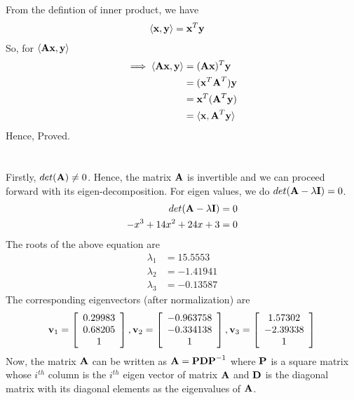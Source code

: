 \documentclass[12pt, a4paper]{article}
\begin{document}
\section{}

From the defintion of inner product, we have
\begin{align*}
    \langle \textbf{x}, \textbf{y} \rangle &= \textbf{x}^{T} \textbf{y}
\end{align*}
So, for $\langle \textbf{A}\textbf{x}, \textbf{y} \rangle$
\begin{align*}
    \implies \langle \textbf{A}\textbf{x}, \textbf{y} \rangle &= (\textbf{A}\textbf{x})^{T} \textbf{y} \\
    &= ( \textbf{x}^{T} \textbf{A}^{T}) \textbf{y} \\
    &=  \textbf{x}^{T} (\textbf{A}^{T} \textbf{y}) \\
    &=  \langle \textbf{x}, \textbf{A}^{T} \textbf{y} \rangle \\
\end{align*}
Hence, Proved.

\newpage
\section{}
Firstly, $det (\textbf{A}) \neq 0$. Hence, the matrix $\textbf{A}$ is invertible and we can proceed forward with its eigen-decomposition. For eigen values, we do $det(\textbf{A} - \lambda \textbf{I}) = 0$.
\begin{align*}
    det(\textbf{A} - \lambda \textbf{I}) &= 0 \\
    -x^3+14 x^2+24 x+3 &= 0
\end{align*}
The roots of the above equation are
\begin{align*}
    \lambda_1 &= 15.5553 \\
    \lambda_2 &= -1.41941 \\
    \lambda_3 &= -0.13587
\end{align*}
The corresponding eigenvectors (after normalization) are
\begin{align*}
    \textbf{v}_1 = \left[ {\begin{array}{c}
        0.29983 \\
        0.68205 \\
        1
    \end{array} } \right],
    \textbf{v}_2 = \left[ {\begin{array}{c}
        -0.963758 \\
        -0.334138 \\
        1
    \end{array} } \right],
    \textbf{v}_3 = \left[ {\begin{array}{c}
        1.57302 \\
        -2.39338 \\
        1
    \end{array} } \right]
\end{align*}
Now, the matrix $\textbf{A}$ can be written as $\textbf{A} = \textbf{P} \textbf{D} \textbf{P}^{-1}$ where $\textbf{P}$ is a square matrix whose $i^{th}$ column is the $i^{th}$ eigen vector of matrix $\textbf{A}$ and $\textbf{D}$ is the diagonal matrix with its diagonal elements as the eigenvalues of $\textbf{A}$.
\end{document}
